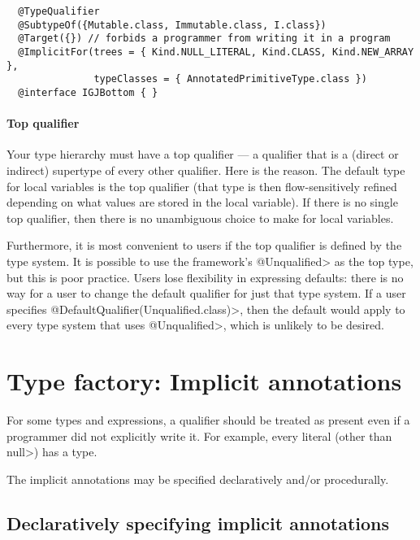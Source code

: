 \begin{Verbatim}
  @TypeQualifier
  @SubtypeOf({Mutable.class, Immutable.class, I.class})
  @Target({}) // forbids a programmer from writing it in a program
  @ImplicitFor(trees = { Kind.NULL_LITERAL, Kind.CLASS, Kind.NEW_ARRAY },
               typeClasses = { AnnotatedPrimitiveType.class })
  @interface IGJBottom { }
\end{Verbatim}


\paragraph{Top qualifier\label{top-qualifier}}
Your type hierarchy must have a top qualifier
--- a qualifier that is a (direct or indirect) supertype of every other
qualifier.
Here is the reason.
The default type for local variables is the top
qualifier (that type is then flow-sensitively
refined depending on what values are stored in the local variable).
If there is no single top qualifier, then there is no
unambiguous choice to make for local variables.

Furthermore, it is most convenient to users if the top qualifier is defined
by the type system.  It is possible to use the framework's
\<@Unqualified> as the top type, but this is poor practice.
Users lose
flexibility in expressing defaults:  there is no
way for a user to change the default qualifier for just that type system.
If a user specifies
\<@DefaultQualifier(Unqualified.class)>,
then the default would apply to every
type system that uses \<@Unqualified>, which is unlikely to be desired.


\section{Type factory: Implicit annotations\label{writing-type-introduction}}

For some types and expressions, a qualifier should be treated as present
even if a programmer did not explicitly write it.  For example, every
literal (other than \<null>) has a  type.

The implicit annotations may be specified declaratively and/or procedurally.


\subsection{Declaratively specifying implicit annotations\label{declarative-type-introduction}}

